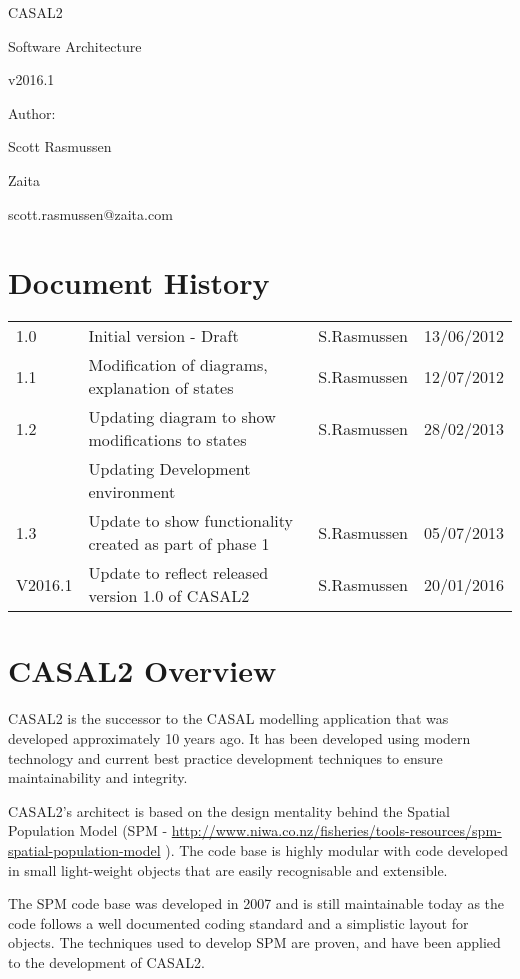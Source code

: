 \documentclass[a4paper,11pt,twoside,pdftex,draft]{article}
\date{}
\begin{document}
CASAL2

Software Architecture

v2016.1

Author:

Scott Rasmussen

Zaita

scott.rasmussen@zaita.com

\hypertarget{document-history}{%
\section[Document
History]{\texorpdfstring{\protect\hypertarget{anchor}{}{}Document
History}{Document History}}\label{document-history}}

\begin{longtable}[]{@{}llll@{}}
\toprule
\endhead
1.0 & Initial version - Draft & S.Rasmussen & 13/06/2012\tabularnewline
1.1 & Modification of diagrams, explanation of states & S.Rasmussen &
12/07/2012\tabularnewline
1.2 & Updating diagram to show modifications to states & S.Rasmussen &
28/02/2013\tabularnewline
& Updating Development environment & &\tabularnewline
1.3 & Update to show functionality created as part of phase 1 &
S.Rasmussen & 05/07/2013\tabularnewline
V2016.1 & Update to reflect released version 1.0 of CASAL2 & S.Rasmussen
& 20/01/2016\tabularnewline
\bottomrule
\end{longtable}

\hypertarget{casal2-overview}{%
\section[CASAL2
Overview]{\texorpdfstring{\protect\hypertarget{anchor-1}{}{}CASAL2
Overview}{CASAL2 Overview}}\label{casal2-overview}}

CASAL2 is the successor to the CASAL modelling application that was
developed approximately 10 years ago. It has been developed using modern
technology and current best practice development techniques to ensure
maintainability and integrity.

CASAL2's architect is based on the design mentality behind the Spatial
Population Model (SPM -
\url{http://www.niwa.co.nz/fisheries/tools-resources/spm-spatial-population-model}
). The code base is highly modular with code developed in small
light-weight objects that are easily recognisable and extensible.

The SPM code base was developed in 2007 and is still maintainable today
as the code follows a well documented coding standard and a simplistic
layout for objects. The techniques used to develop SPM are proven, and
have been applied to the development of CASAL2.
\end{document}
